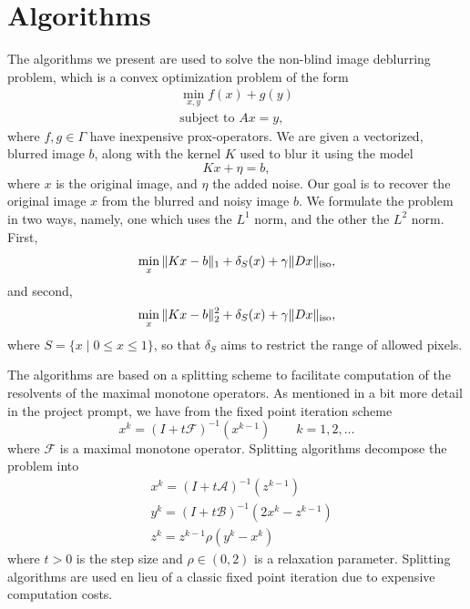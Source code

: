 \documentclass{article}
\theoremstyle{definition}
\theoremstyle{remark}
\begin{document}
\medskip



\section{Algorithms}
\label{algos}
The algorithms we present are used to solve the non-blind image deblurring problem, which is a convex optimization problem of the form 
\begin{equation}
  \begin{split}
    \min_{x,y} f(x) + g(y)\\ 
    \text{subject to }Ax= y,
  \end{split}
\end{equation}
where $f, g \in \Gamma$ have inexpensive prox-operators. We are given a vectorized, blurred image $b$, along with the kernel $K$ used to blur it using the model 
\begin{equation}
  Kx + \eta = b,
\end{equation}
where $x$ is the original image, and $\eta$ the added noise. Our goal is to recover the original image $x$ from the blurred and noisy image $b$. We formulate the problem in two ways, namely, one which uses the $L^1$ norm, and the other the $L^2$ norm. First,
\begin{equation}\label{l1}
    \min_x \|Kx - b\|_1 + \delta_S(x) + \gamma \|Dx \|_{\operatorname{{iso}}}, 
\end{equation}
and second,
\begin{equation}\label{l2}
    \min_x \|Kx - b\|_2^2 + \delta_S(x) + \gamma \|Dx \|_{\operatorname{{iso}}}, 
\end{equation}
where $S = \{x \mid 0 \leq x \leq 1\}$, so that $\delta_S$ aims to restrict the range of allowed pixels. 

\medskip

The algorithms are based on a splitting scheme to facilitate computation of the resolvents of the maximal monotone operators. As mentioned in a bit more detail in the project prompt, we have from the fixed point iteration scheme
$$
x^k = (I + t \mathcal{F})^{-1}(x^{k-1}) \qquad k = 1, 2, ...
$$
where $\mathcal{F}$ is a maximal monotone operator. Splitting algorithms decompose the problem into
\begin{align*}
    &x^k = (I + t \mathcal{A})^{-1}(z^{k-1}) \\
    &y^k = (I + t \mathcal{B})^{-1}(2x^{k} - z^{k-1}) \\
    &z^k = z^{k-1} \rho(y^k - x^k)
\end{align*}
where $t > 0$ is the step size and $\rho \in (0, 2)$ is a relaxation parameter. Splitting algorithms are used en lieu of a classic fixed point iteration due to expensive computation costs.
\end{document}
